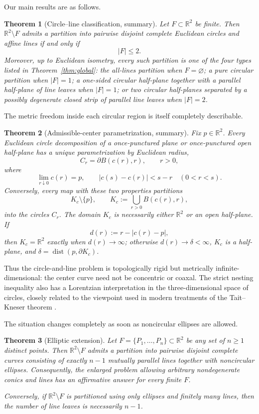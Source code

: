 \documentclass[11pt]{article}
\newtheorem{theorem}{Theorem}[section]
\newcommand{\R}{\mathbb{R}}
\DeclareMathOperator{\dist}{dist}
\begin{document}
Our main results are as follows.

\begin{theorem}[Circle--line classification, summary]\label{thm:intro-circleline}
Let $F\subset\R^2$ be finite. Then $\R^2\setminus F$ admits a partition into pairwise disjoint complete Euclidean circles and affine lines if and only if
\[
|F|\le2.
\]
Moreover, up to Euclidean isometry, every such partition is one of the four types listed in Theorem~\ref{thm:global}: the all-lines partition when $F=\varnothing$; a pure circular partition when $|F|=1$; a one-sided circular half-plane together with a parallel half-plane of line leaves when $|F|=1$; or two circular half-planes separated by a possibly degenerate closed strip of parallel line leaves when $|F|=2$.
\end{theorem}

The metric freedom inside each circular region is itself completely describable.

\begin{theorem}[Admissible-center parametrization, summary]\label{thm:intro-admissible}
Fix $p\in\R^2$. Every Euclidean circle decomposition of a once-punctured plane or once-punctured open half-plane has a unique parametrization by Euclidean radius,
\[
C_r=\partial B(c(r),r),\qquad r>0,
\]
where
\[
\lim_{r\downarrow0}c(r)=p,
\qquad
|c(s)-c(r)|<s-r\quad(0<r<s).
\]
Conversely, every map with these two properties partitions
\[
K_c\setminus\{p\},\qquad K_c:=\bigcup_{r>0}B(c(r),r),
\]
into the circles $C_r$. The domain $K_c$ is necessarily either $\R^2$ or an open half-plane. If
\[
d(r):=r-|c(r)-p|,
\]
then $K_c=\R^2$ exactly when $d(r)\to\infty$; otherwise $d(r)\to\delta<\infty$, $K_c$ is a half-plane, and $\delta=\dist(p,\partial K_c)$.
\end{theorem}

Thus the circle-and-line problem is topologically rigid but metrically infinite-dimensional: the center curve need not be concentric or coaxal. The strict nesting inequality also has a Lorentzian interpretation in the three-dimensional space of circles, closely related to the viewpoint used in modern treatments of the Tait--Kneser theorem \cite{BorJackmanTabachnikov}.

The situation changes completely as soon as noncircular ellipses are allowed.

\begin{theorem}[Elliptic extension]\label{thm:intro-elliptic}
Let $F=\{P_1,\dots,P_n\}\subset\R^2$ be any set of $n\ge1$ distinct points. Then $\R^2\setminus F$ admits a partition into pairwise disjoint complete curves consisting of exactly $n-1$ mutually parallel lines together with noncircular ellipses. Consequently, the enlarged problem allowing arbitrary nondegenerate conics and lines has an affirmative answer for every finite $F$.

Conversely, if $\R^2\setminus F$ is partitioned using only ellipses and finitely many lines, then the number of line leaves is necessarily $n-1$.
\end{theorem}
\end{document}
